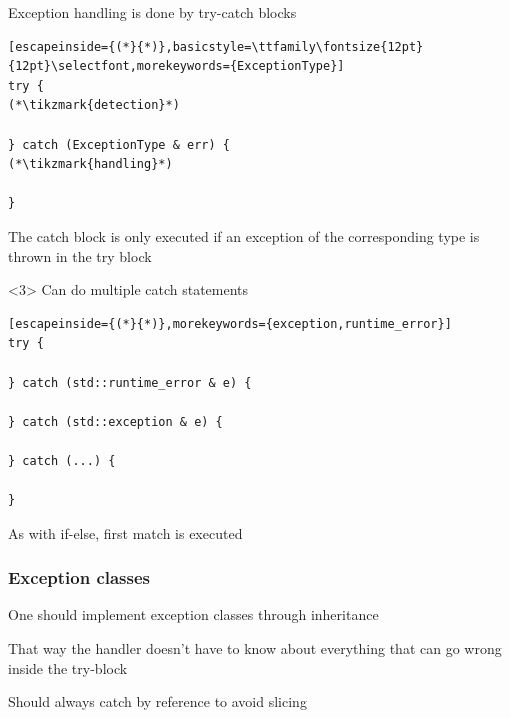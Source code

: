 \documentclass[14pt,a4paper,dvipsnames,usenames]{beamer}
\begin{document}
\begin{frame}[fragile]
\begin{onlyenv}
  Exception handling is done by {\color{FeebleWeek}try}-{\color{FeebleWeek}catch} blocks

  \vspace{.5em}
  \begin{lstlisting}[escapeinside={(*}{*)},basicstyle=\ttfamily\fontsize{12pt}{12pt}\selectfont,morekeywords={ExceptionType}]
try {
(*\tikzmark{detection}*)

} catch (ExceptionType & err) {
(*\tikzmark{handling}*)

}
  \end{lstlisting}

  \nointerlineskip

  The catch block is only executed if an exception of the corresponding type is thrown in the try block
  \end{onlyenv}

  \begin{onlyenv}<3>
    Can do multiple catch statements

    \vspace{.5em}
    \begin{lstlisting}[escapeinside={(*}{*)},morekeywords={exception,runtime_error}]
try {

} catch (std::runtime_error & e) {

} catch (std::exception & e) {

} catch (...) {

}
    \end{lstlisting}

    \vspace{.5em}
    As with if-else, first match is executed
  \end{onlyenv}
  
\end{frame}

\begin{frame}[fragile]
  \frametitle{Exception classes}

  One should implement exception classes through inheritance

  \vspace{1em}
  That way the handler doesn't have to know about everything that can go
  wrong inside the try-block

  \vspace{1em}
  Should always catch by reference to avoid slicing
  
\end{frame}
\end{document}
